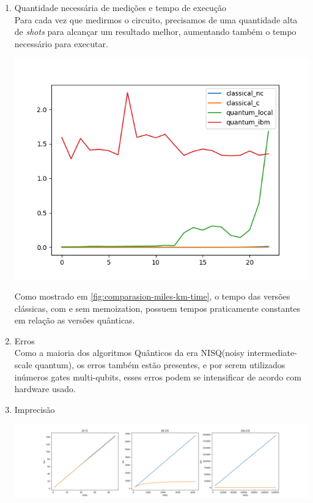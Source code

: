 \documentclass{article}
\begin{document}
\begin{enumerate}
\item{Quantidade necessária de medições e tempo de execução}\\
Para cada vez que medirmos o circuito, precisamos de uma quantidade alta de \emph{shots} para alcançar um resultado melhor, aumentando também o tempo necessário para executar.

\begin{center}
	\includegraphics[scale=0.6]{comparison_miles_to_km.png}
	\label{fig:comparasion-miles-km-time}
\end{center}

Como mostrado em \ref{fig:comparasion-miles-km-time}, o tempo das versões clássicas, com e sem memoization, possuem tempos praticamente constantes em relação as versões quânticas.


\item{Erros}\\
Como a maioria dos algoritmos Quânticos da era NISQ(noisy intermediate-scale quantum), os erros também estão presentes, e por serem utilizados inúmeros gates multi-qubits, esses erros podem se intensificar de acordo com hardware usado.

\item{Imprecisão}\\

\begin{center}
	\includegraphics[scale=0.2]{miles_to_km_defiance.png}
	\label{fig:values-miles-km-quantum}
\end{center}


\end{enumerate}
\end{document}
